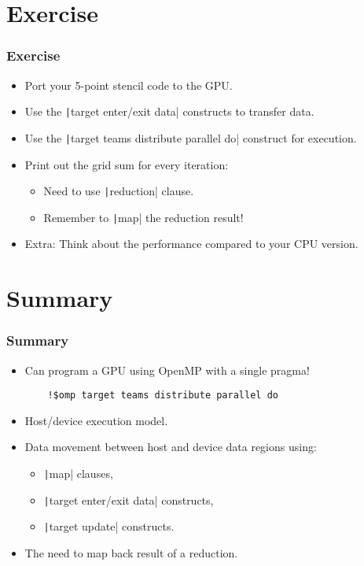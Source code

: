 \documentclass{beamer}
\begin{document}
\section{Exercise}
\begin{frame}
\frametitle{Exercise}
\begin{itemize}
  \item Port your 5-point stencil code to the GPU.
  \item Use the \texttt|target enter/exit data| constructs to transfer data.
  \item Use the \texttt|target teams distribute parallel do| construct for execution.
  \item Print out the grid sum for every iteration:
    \begin{itemize}
      \item Need to use \texttt|reduction| clause.
      \item Remember to \texttt|map| the reduction result!
    \end{itemize}
  \item Extra: Think about the performance compared to your CPU version.
\end{itemize}
\end{frame}

\section{Summary}
\begin{frame}[fragile]
\frametitle{Summary}
\begin{itemize}
  \item Can program a GPU using OpenMP with a single pragma!
    \begin{verbatim}
    !$omp target teams distribute parallel do
    \end{verbatim}

  \item Host/device execution model.

  \item Data movement between host and device data regions using:
    \begin{itemize}
      \item \texttt|map| clauses,
      \item \texttt|target enter/exit data| constructs,
      \item \texttt|target update| constructs.
    \end{itemize}

  \item The need to map back result of a reduction.

\end{itemize}
\end{frame}

\end{document}
